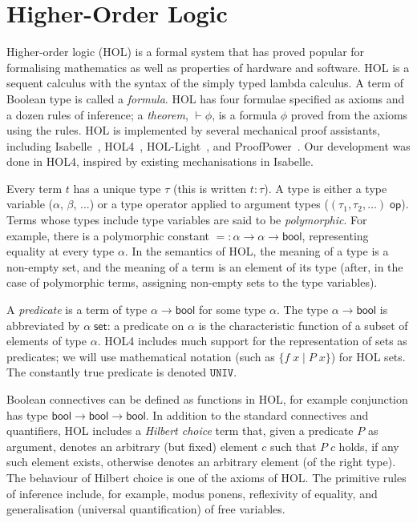 \documentclass[twoside,titlepage,11pt]{article}
\begin{document}
\section{Higher-Order Logic}%
\newcommand{\bool}{\ensuremath{\mathsf{bool}}}
Higher-order logic (HOL) is a formal system that has proved popular for formalising mathematics as well as properties of hardware and software.
HOL is a sequent calculus with the syntax of the simply typed lambda calculus.
A term of Boolean type is called a \emph{formula}.
HOL has four formulae specified as axioms and a dozen rules of inference; a \emph{theorem}, $\vdash\phi$, is a formula $\phi$ proved from the axioms using the rules.
HOL is implemented by several mechanical proof assistants, including Isabelle~\cite{DBLP:conf/tphol/WenzelPN08}, HOL4~\cite{DBLP:conf/tphol/SlindN08}, HOL-Light~\cite{DBLP:conf/tphol/Harrison09a}, and ProofPower~\cite{ProofPower}.
Our development was done in HOL4, inspired by existing mechanisations \cite{Katovsky,DBLP:journals/entcs/OKeefe04} in Isabelle.

Every term $t$ has a unique type $\tau$ (this is written $t:\tau$).
A type is either a type variable ($\alpha$, $\beta$, ...) or a type operator applied to argument types ($(\tau_1,\tau_2,\dots)\;\mathsf{op}$).
Terms whose types include type variables are said to be \emph{polymorphic}.
For example, there is a polymorphic constant $\mathtt{=}:\alpha\to\alpha\to\bool$, representing equality at every type $\alpha$.
In the semantics of HOL, the meaning of a type is a non-empty set, and the meaning of a term is an element of its type (after, in the case of polymorphic terms, assigning non-empty sets to the type variables).

A \emph{predicate} is a term of type $\alpha\to\bool$ for some type $\alpha$.
The type $\alpha\to\bool$ is abbreviated by $\alpha\;\mathsf{set}$: a predicate on $\alpha$ is the characteristic function of a subset of elements of type $\alpha$.
HOL4 includes much support for the representation of sets as predicates; we will use mathematical notation (such as $\{f\;x\mid P\;x\}$) for HOL sets.
The constantly true predicate is denoted $\mathtt{UNIV}$.

Boolean connectives can be defined as functions in HOL, for example conjunction has type $\bool\to\bool\to\bool$.
In addition to the standard connectives and quantifiers, HOL includes a \emph{Hilbert choice} term that, given a predicate $P$ as argument, denotes an arbitrary (but fixed) element $c$ such that $P\; c$ holds, if any such element exists, otherwise denotes an arbitrary element (of the right type).
The behaviour of Hilbert choice is one of the axioms of HOL.
The primitive rules of inference include, for example, modus ponens, reflexivity of equality, and generalisation (universal quantification) of free variables.
\end{document}
